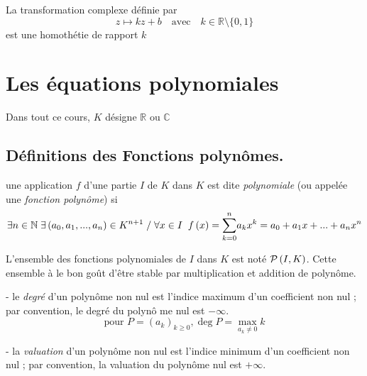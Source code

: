 \documentclass[french]{book}
\newcommand{\bbr}{\mathbb {R}}
\begin{document}
\begin{prop}
  La transformation complexe définie par $$z\mapsto kz+b\quad \text{avec}\quad k\in\bbr\setminus\{0,1\}$$ est une homothétie
de rapport $k$
\end{prop}
 

\chapter{Les équations polynomiales}
Dans tout ce cours, $K$ d\'{e}signe $\mathbb{R}$ ou $\mathbb{C}$%
\section{Définitions des  Fonctions polyn\^{o}mes.}

\begin{defn}

une application $f$ d'une partie $I$ de $K$ dans $K$ est dite \textit{%
polynomiale} (ou appel\'{e}e une \textit{fonction polyn\^{o}me}) si 
\begin{equation*}
\exists n\in \mathbb{N}\;\exists \left( a_{0},a_{1},...,a_{n}\right) \in
K^{n+1}\;/\;\forall x\in I\;\;f\left( x\right) =\underset{k=0}{\overset{n}{%
\sum }}a_{k}x^{k}=a_{0}+a_{1}x+...+a_{n}x^{n}
\end{equation*}

L'ensemble des fonctions polynomiales de $I$ dans $K$ est not\'{e} $\mathcal{%
P}\left( I,K\right) $. Cette ensemble à le bon goût d'être stable par multiplication et addition de polynôme.

\end{defn}


\begin{defn}

\qquad - le \textit{degr\'{e}} d'un polyn\^{o}me non nul est l'indice
maximum d'un coefficient non nul ; par convention, le degr\'{e} du polyn\^{o}%
me nul est $-\infty .$%
\begin{equation*}
\text{pour }P=\left( a_{k}\right) _{k\geqslant 0},\deg P=\underset{a_{k}\neq
0}{\max }k
\end{equation*}

\bigskip \qquad - la \textit{valuation} d'un polyn\^{o}me non nul est
l'indice minimum d'un coefficient non nul ; par convention, la valuation du
polyn\^{o}me nul est $+\infty .$%

\end{defn}

\end{document}
